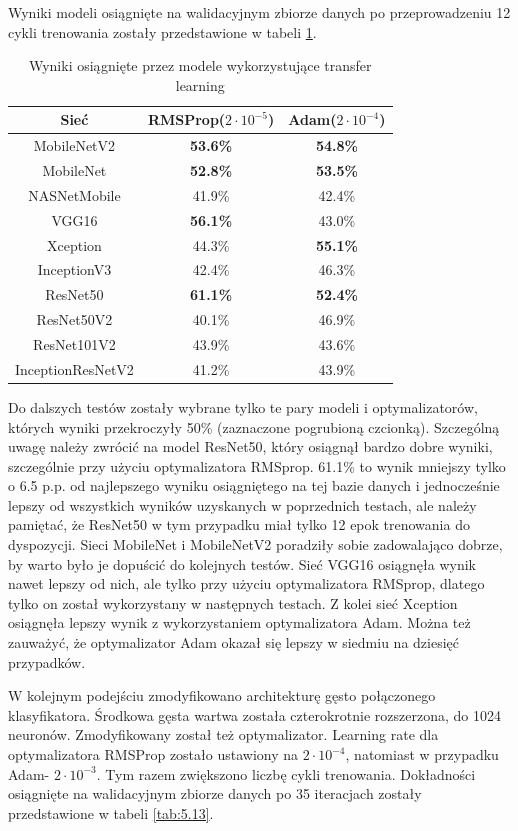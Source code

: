 Wyniki modeli osiągnięte na walidacyjnym zbiorze danych po przeprowadzeniu 12 cykli trenowania zostały przedstawione w tabeli \ref{tab:5.12}.

\begin{table}[H]
  \centering
  \caption{Wyniki osiągnięte przez modele wykorzystujące transfer learning}
    \begin{tabular}{ |c|c|c| }
    \hline
    Sieć & RMSProp($2\cdot10^{-5}$) & Adam($2\cdot10^{-4}$) \\
    \hline
    MobileNetV2 & \textbf{53.6\%} & \textbf{54.8\%} \\ 
    MobileNet & \textbf{52.8\%} & \textbf{53.5\%} \\ 
    NASNetMobile & 41.9\% & 42.4\% \\
    VGG16 & \textbf{56.1\%} & 43.0\% \\
    Xception & 44.3\% & \textbf{55.1\%} \\ 
    InceptionV3 & 42.4\% & 46.3\% \\
    ResNet50 & \textbf{61.1\%} & \textbf{52.4\%} \\ 
    ResNet50V2 & 40.1\% & 46.9\% \\
    ResNet101V2 & 43.9\% & 43.6\% \\ 
    InceptionResNetV2 &  41.2\% & 43.9\% \\
    \hline
    \end{tabular}
  \label{tab:5.12}
\end{table}

Do dalszych testów zostały wybrane tylko te pary modeli i optymalizatorów, których wyniki przekroczyły 50\% (zaznaczone pogrubioną czcionką). Szczególną uwagę należy zwrócić na model ResNet50, który osiągnął bardzo dobre wyniki, szczególnie przy użyciu optymalizatora RMSprop. 61.1\% to wynik mniejszy tylko o 6.5 p.p. od najlepszego wyniku osiągniętego na tej bazie danych i jednocześnie lepszy od wszystkich wyników uzyskanych w poprzednich testach, ale należy pamiętać, że ResNet50 w tym przypadku miał tylko 12 epok trenowania do dyspozycji. Sieci MobileNet i MobileNetV2 poradziły sobie zadowalająco dobrze, by warto było je dopuścić do kolejnych testów. Sieć VGG16 osiągnęła wynik nawet lepszy od nich, ale tylko przy użyciu optymalizatora RMSprop, dlatego tylko on został wykorzystany w następnych testach. Z kolei sieć Xception osiągnęła lepszy wynik z wykorzystaniem optymalizatora Adam. Można też zauważyć, że optymalizator Adam okazał się lepszy w siedmiu na dziesięć przypadków.

W kolejnym podejściu zmodyfikowano architekturę gęsto połączonego klasyfikatora. Środkowa gęsta wartwa została czterokrotnie rozszerzona, do 1024 neuronów. Zmodyfikowany został też optymalizator. Learning rate dla optymalizatora RMSProp zostało ustawiony na $2\cdot10^{-4}$, natomiast w przypadku Adam- $2\cdot10^{-3}$. Tym razem zwiększono liczbę cykli trenowania. Dokładności osiągnięte na walidacyjnym zbiorze danych po 35 iteracjach zostały przedstawione w tabeli \ref{tab:5.13}.

